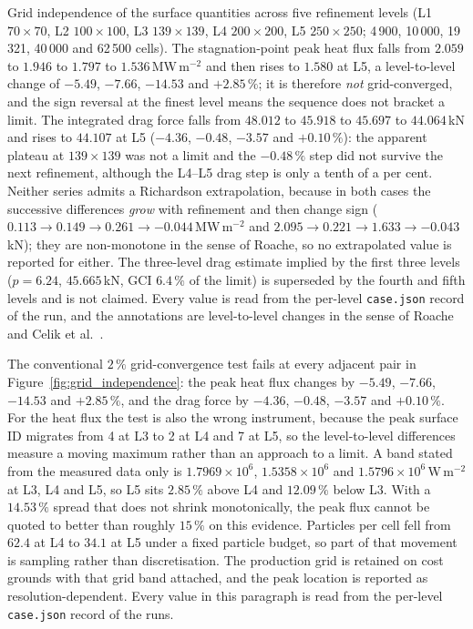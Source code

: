 Grid independence of the surface quantities across five refinement levels (L1 $70\times70$, L2 $100\times100$, L3 $139\times139$, L4 $200\times200$, L5 $250\times250$; 4\,900, 10\,000, 19\,321, 40\,000 and 62\,500 cells). The stagnation-point peak heat flux falls from $2.059$ to $1.946$ to $1.797$ to $1.536$\,MW\,m$^{-2}$ and then rises to $1.580$ at L5, a level-to-level change of $-5.49$, $-7.66$, $-14.53$ and $+2.85\,\%$; it is therefore \emph{not} grid-converged, and the sign reversal at the finest level means the sequence does not bracket a limit. The integrated drag force falls from $48.012$ to $45.918$ to $45.697$ to $44.064$\,kN and rises to $44.107$ at L5 ($-4.36$, $-0.48$, $-3.57$ and $+0.10\,\%$): the apparent plateau at $139\times139$ was not a limit and the $-0.48\,\%$ step did not survive the next refinement, although the L4--L5 drag step is only a tenth of a per cent. Neither series admits a Richardson extrapolation, because in both cases the successive differences \emph{grow} with refinement and then change sign ($0.113 \to 0.149 \to 0.261 \to -0.044$\,MW\,m$^{-2}$ and $2.095 \to 0.221 \to 1.633 \to -0.043$\,kN); they are non-monotone in the sense of Roache, so no extrapolated value is reported for either. The three-level drag estimate implied by the first three levels ($p = 6.24$, $45.665$\,kN, GCI $6.4\,\%$ of the limit) is superseded by the fourth and fifth levels and is not claimed. Every value is read from the per-level \texttt{case.json} record of the run, and the annotations are level-to-level changes in the sense of Roache~\cite{roache1998verification} and Celik et al.~\cite{celik2008procedure}.


The conventional $2\,\%$ grid-convergence test fails at every adjacent pair in
Figure~\ref{fig:grid_independence}: the peak heat flux changes by $-5.49$,
$-7.66$, $-14.53$ and $+2.85\,\%$, and the drag force by $-4.36$, $-0.48$,
$-3.57$ and $+0.10\,\%$. For the heat flux the test is also the wrong
instrument, because the peak surface ID migrates from 4 at L3 to 2 at L4 and 7
at L5, so the level-to-level differences measure a moving maximum rather than
an approach to a limit. A band stated from the measured data only is
$1.7969\times10^6$, $1.5358\times10^6$ and $1.5796\times10^6$\,W\,m$^{-2}$ at
L3, L4 and L5, so L5 sits $2.85\,\%$ above L4 and $12.09\,\%$ below L3. With a
$14.53\,\%$ spread that does not shrink monotonically, the peak flux cannot be
quoted to better than roughly $15\,\%$ on this evidence. Particles per cell
fell from $62.4$ at L4 to $34.1$ at L5 under a fixed particle budget, so part
of that movement is sampling rather than discretisation. The production grid
is retained on cost grounds with that grid band attached, and the peak
location is reported as resolution-dependent. Every value in this paragraph
is read from the per-level \texttt{case.json} record of the runs.

